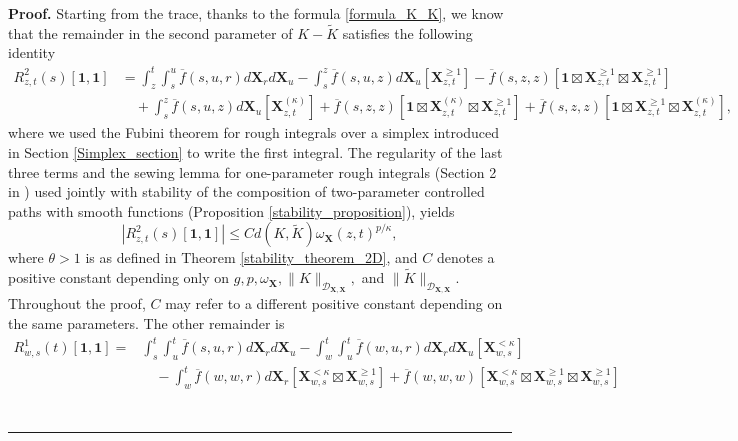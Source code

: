 \documentclass{article}%
\newenvironment{proof}[1][Proof]{\noindent\textbf{#1.} }{\ \rule{0.5em}{0.5em}}
\begin{document}
\begin{proof}
Starting from the trace, thanks to the formula \eqref{formula_K_K}, we know that the remainder in the second parameter of $K - \tilde K$ satisfies the following identity
\begin{align*}
R^{2}_{z,t}(s)[\mathbf{1}, \mathbf{1}] &= \int_z^t \int_s^u \overline f(s,u,r) d\mathbf{X}_r d\mathbf{X}_u - \int_s^z \overline f(s,u,z) d\mathbf{X}_u \left[\mathbf{X}^{\ge 1}_{z,t}\right] - \overline f(s,z,z) \left[\mathbf{1} \boxtimes \mathbf{X}^{\geq 1}_{z,t} \boxtimes \mathbf{X}^{\geq 1}_{z,t}\right]\\
&\quad +\int_s^z \overline f(s,u,z) d\mathbf{X}_u \left[\mathbf{X}^{(\kappa)}_{z,t}\right] +  \overline f(s,z,z) \left[\mathbf{1} \boxtimes \mathbf{X}^{(\kappa)}_{z,t} \boxtimes \mathbf{X}^{\geq 1}_{z,t}\right] + \overline f(s,z,z) \left[\mathbf{1} \boxtimes \mathbf{X}^{\geq 1}_{z,t} \boxtimes \mathbf{X}^{(\kappa)}_{z,t}\right],
\end{align*}
where we used the Fubini theorem for rough integrals over a simplex introduced in Section \ref{Simplex_section} to write the first integral.\newline
The regularity of the last three terms and the sewing lemma for one-parameter rough integrals (Section 2 in \cite{cass2022combinatorial}) used jointly with stability of the composition of two-parameter controlled paths with smooth functions (Proposition \ref{stability_proposition}), yields 
\[
\left|R^{2}_{z,t}(s)[\mathbf{1}, \mathbf{1}] \right| \leq C d(K, \tilde{K})\omega_{\mathbf{X}}(z,t)^{p/\kappa},
\]
where $\theta>1$ is as defined in Theorem \ref{stability_theorem_2D}, and $C$ denotes a positive constant depending only on $g,p,\omega_{\mathbf{X}},\|K\|_{\mathcal{D}_{\mathbf{X},\mathbf{X}}},$ and $\|\tilde K\|_{\mathcal{D}_{\mathbf{X},\mathbf{X}}}$. Throughout the proof, $C$ may refer to a different positive constant depending on the same parameters.\newline
The other remainder is 
\begin{align*}
    R^{1}_{w,s}(t)[\mathbf{1},\mathbf{1}]= & \int_s^t \int_u^t \overline f(s,u,r) d\mathbf{X}_r d\mathbf{X}_u  - \int_w^t \int_u^t \overline f(w,u,r) d\mathbf{X}_r d\mathbf{X}_u \left[\mathbf{X}^{< \kappa}_{w,s}\right]\\ 
    & \quad  
    - \int_w^t \overline f(w,w,r) d\mathbf{X}_r \left[\mathbf{X}_{w,s}^{< \kappa }\boxtimes \mathbf{X}^{\ge 1}_{w,s}\right] + \overline f(w,w,w)\left[ \mathbf{X}^{< \kappa}_{w,s} \boxtimes \mathbf{X}^{\ge 1}_{w,s} \boxtimes \mathbf{X}^{\ge 1}_{w,s} \right]\\

\end{align*}
\end{proof}
\end{document}
